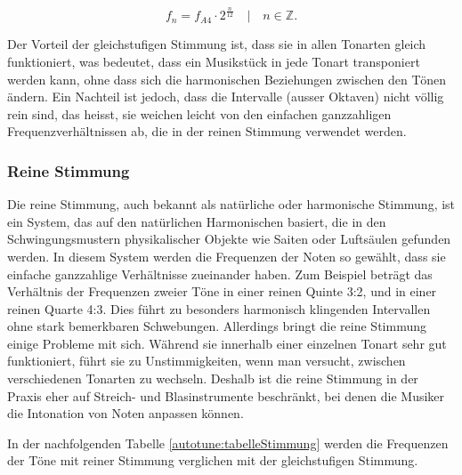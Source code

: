 \begin{equation}
    f_n
    =
    f_{A4} \cdot 2^{\frac{n}{12}}
    \quad | \quad
    n \in \mathbb{Z}.
    \label{autotune:equation1}
    \end{equation}

Der Vorteil der gleichstufigen Stimmung ist, dass sie in allen Tonarten gleich funktioniert, was bedeutet, dass ein Musikstück in jede Tonart transponiert werden kann, ohne dass sich die harmonischen Beziehungen zwischen den Tönen ändern.
Ein Nachteil ist jedoch, dass die Intervalle (ausser Oktaven) nicht völlig rein sind, das heisst, sie weichen leicht von den einfachen ganzzahligen Frequenzverhältnissen ab, die in der reinen Stimmung verwendet werden.

\subsubsection{Reine Stimmung
\label{autotune:subsubsection:reineStimmung}}
Die reine Stimmung, auch bekannt als natürliche oder harmonische Stimmung, ist ein System, das auf den natürlichen Harmonischen basiert, die in den Schwingungsmustern physikalischer Objekte wie Saiten oder Luftsäulen gefunden werden.
In diesem System werden die Frequenzen der Noten so gewählt, dass sie einfache ganzzahlige Verhältnisse zueinander haben.
Zum Beispiel beträgt das Verhältnis der Frequenzen zweier Töne in einer reinen Quinte 3:2, und in einer reinen Quarte 4:3.
Dies führt zu besonders harmonisch klingenden Intervallen ohne stark bemerkbaren Schwebungen.
Allerdings bringt die reine Stimmung einige Probleme mit sich.
Während sie innerhalb einer einzelnen Tonart sehr gut funktioniert, führt sie zu Unstimmigkeiten, wenn man versucht, zwischen verschiedenen Tonarten zu wechseln.
Deshalb ist die reine Stimmung in der Praxis eher auf Streich- und Blasinstrumente beschränkt, bei denen die Musiker die Intonation von Noten anpassen können.

In der nachfolgenden Tabelle \ref{autotune:tabelleStimmung} werden die Frequenzen der Töne mit reiner Stimmung verglichen mit der gleichstufigen Stimmung.

